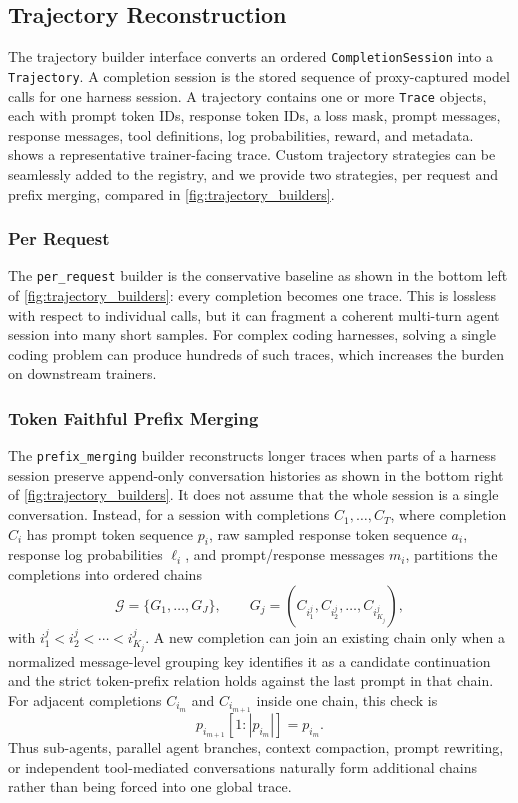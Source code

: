 \subsection{Trajectory Reconstruction}

The trajectory builder interface converts an ordered \texttt{CompletionSession} into a \texttt{Trajectory}. A completion session is the stored sequence of proxy-captured model calls for one harness session. A trajectory contains one or more \texttt{Trace} objects, each with prompt token IDs, response token IDs, a loss mask, prompt messages, response messages, tool definitions, log probabilities, reward, and metadata.  shows a representative trainer-facing trace.
Custom trajectory strategies can be seamlessly added to the registry, and we provide two strategies, per request and prefix merging, compared in \cref{fig:trajectory_builders}.

\subsubsection{Per Request}

The \texttt{per\_request} builder is the conservative baseline as shown in the bottom left of  \cref{fig:trajectory_builders}: every completion becomes one trace. This is lossless with respect to individual calls, but it can fragment a coherent multi-turn agent session into many short samples. For complex coding harnesses, solving a single coding problem can produce hundreds of such traces, which increases the burden on downstream trainers.


\subsubsection{Token Faithful Prefix Merging}
\label{sec:prefix_merging}

The \texttt{prefix\_merging} builder reconstructs longer traces when parts of a harness session preserve append-only conversation histories as shown in the bottom right of \cref{fig:trajectory_builders}. It does not assume that the whole session is a single conversation. Instead, for a session with completions $C_1,\ldots,C_T$, where completion $C_i$ has prompt token sequence $p_i$, raw sampled response token sequence $a_i$, response log probabilities $\ell_i$, and prompt/response messages $m_i$, \polar partitions the completions into ordered chains
\[
\mathcal{G} = \{G_1,\ldots,G_J\}, \qquad
G_j = (C_{i^j_1}, C_{i^j_2}, \ldots, C_{i^j_{K_j}}),
\]
with $i^j_1 < i^j_2 < \cdots < i^j_{K_j}$. A new completion can join an existing chain only when a normalized message-level grouping key identifies it as a candidate continuation and the strict token-prefix relation holds against the last prompt in that chain. For adjacent completions $C_{i_m}$ and $C_{i_{m+1}}$ inside one chain, this check is
\[
p_{i_{m+1}}[1:|p_{i_m}|] = p_{i_m}.
\]
Thus sub-agents, parallel agent branches, context compaction, prompt rewriting, or independent tool-mediated conversations naturally form additional chains rather than being forced into one global trace.

